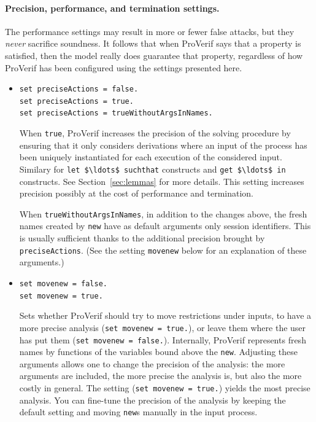 \documentclass{book}
\begin{document}
\paragraph{Precision, performance, and termination settings.}

The performance settings may result in more or fewer false attacks, but they \emph{never} sacrifice soundness. It follows that when ProVerif says that a property is satisfied, then the model really does guarantee that property, regardless of how ProVerif has been configured using the settings presented here.

\begin{itemize}

\item \lstinline{set preciseActions = false.}\\
\lstinline{set preciseActions = true.}\\
\lstinline{set preciseActions = trueWithoutArgsInNames.}

When \lstinline!true!, ProVerif increases the precision of the solving procedure by ensuring that it only considers derivations where an input of the process has been uniquely instantiated for each execution of the considered input. Similary for \lstinline!let $\ldots$ suchthat! constructs and \lstinline!get $\ldots$ in! constructs. See Section~\ref{sec:lemmas} for more details. This setting increases precision possibly at the cost of performance and termination.

When \lstinline!trueWithoutArgsInNames!, in addition to the changes above, the fresh names created by \lstinline!new! have as default arguments only session identifiers. This is usually sufficient thanks to the additional precision brought by \lstinline!preciseActions!. (See the setting \lstinline{movenew} below for an explanation of these arguments.)

\item \lstinline{set movenew = false.}\\
\lstinline{set movenew = true.}

Sets whether ProVerif should try to move restrictions under inputs,
to have a more precise analysis (\lstinline{set movenew = true.}), or
leave them where the user has put them
(\lstinline{set movenew = false.}). Internally, ProVerif represents
fresh names by functions of the variables bound above the \lstinline{new}.
Adjusting these arguments allows one to change the precision of the
analysis: the more arguments are included, the more precise the analysis is,
but also the more costly in general. The setting
(\lstinline{set movenew = true.}) yields the most precise analysis.
You can fine-tune the precision of the analysis by keeping the
default setting and moving \lstinline{new}s manually in the input
process.


\end{itemize}
\end{document}
